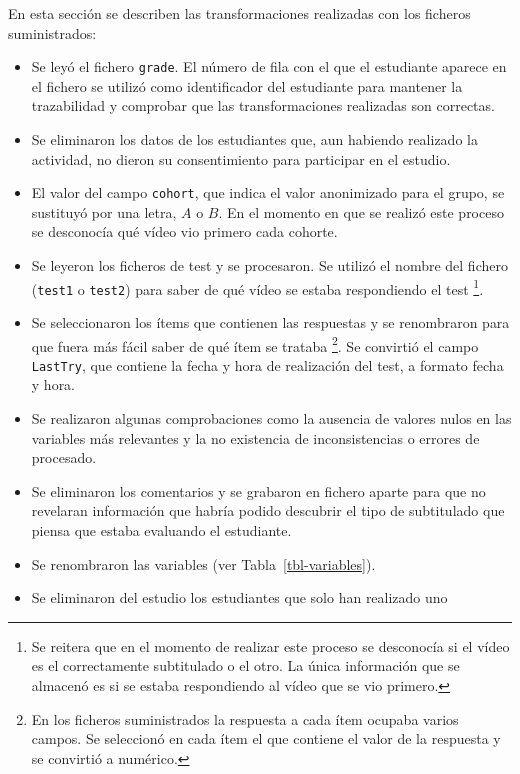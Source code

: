 \documentclass[
  12pt,
  a4paper,
  extrafontsizes,
  onecolumn,
  openright,
  table]{memoir}
\begin{document}
En esta sección se describen las transformaciones realizadas con los
ficheros suministrados:

\begin{itemize}
\item
  Se leyó el fichero \texttt{grade}. El número de fila con el que el
  estudiante aparece en el fichero se utilizó como identificador del
  estudiante para mantener la trazabilidad y comprobar que las
  transformaciones realizadas son correctas.
\item
  Se eliminaron los datos de los estudiantes que, aun habiendo realizado
  la actividad, no dieron su consentimiento para participar en el
  estudio.
\item
  El valor del campo \texttt{cohort}, que indica el valor anonimizado
  para el grupo, se sustituyó por una letra, \(A\) o \(B\). En el
  momento en que se realizó este proceso se desconocía qué vídeo vio
  primero cada cohorte.
\item
  Se leyeron los ficheros de test y se procesaron. Se utilizó el nombre
  del fichero (\texttt{test1} o \texttt{test2}) para saber de qué vídeo
  se estaba respondiendo el test \footnote{Se reitera que en el momento
    de realizar este proceso se desconocía si el vídeo es el
    correctamente subtitulado o el otro. La única información que se
    almacenó es si se estaba respondiendo al vídeo que se vio primero.}.
\item
  Se seleccionaron los ítems que contienen las respuestas y se
  renombraron para que fuera más fácil saber de qué ítem se trataba
  \footnote{En los ficheros suministrados la respuesta a cada ítem
    ocupaba varios campos. Se seleccionó en cada ítem el que contiene el
    valor de la respuesta y se convirtió a numérico.}. Se convirtió el
  campo \texttt{LastTry}, que contiene la fecha y hora de realización
  del test, a formato fecha y hora.
\item
  Se realizaron algunas comprobaciones como la ausencia de valores nulos
  en las variables más relevantes y la no existencia de inconsistencias
  o errores de procesado.
\item
  Se eliminaron los comentarios y se grabaron en fichero aparte para que
  no revelaran información que habría podido descubrir el tipo de
  subtitulado que piensa que estaba evaluando el estudiante.
\item
  Se renombraron las variables (ver Tabla~\ref{tbl-variables}).
\item
  Se eliminaron del estudio los estudiantes que solo han realizado uno

\end{itemize}
\end{document}
